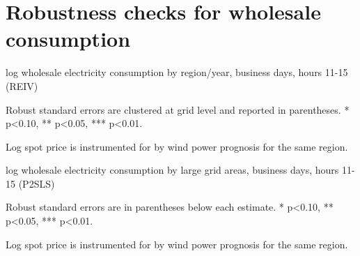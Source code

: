 \section{Robustness checks for wholesale consumption}
\label{app:robustness_wholesale}
\begin{table}[H]
\centering
\begin{threeparttable}
  \caption{log wholesale electricity consumption by region/year, business days, hours 11-15 (REIV)}
  \label{tab:ws_region_year}
  \footnotesize
    
    \begin{tablenotes}
    \item Robust standard errors are clustered at grid level and reported in parentheses. * p<0.10, ** p<0.05, *** p<0.01.
    \item Log spot price is instrumented for by wind power prognosis for the same region.
  \end{tablenotes}
\end{threeparttable}
\end{table}

\begin{landscape}
\begin{table}[H]
\centering
\begin{threeparttable}
  \caption{log wholesale electricity consumption by large grid areas, business days, hours 11-15 (P2SLS)}
  \label{tab:ws_grids_large}
  \footnotesize
    
    \begin{tablenotes}
    \item Robust standard errors are in parentheses below each estimate. * p<0.10, ** p<0.05, *** p<0.01.
    \item Log spot price is instrumented for by wind power prognosis for the same region.
  \end{tablenotes}
\end{threeparttable}
\end{table}

\end{landscape}
